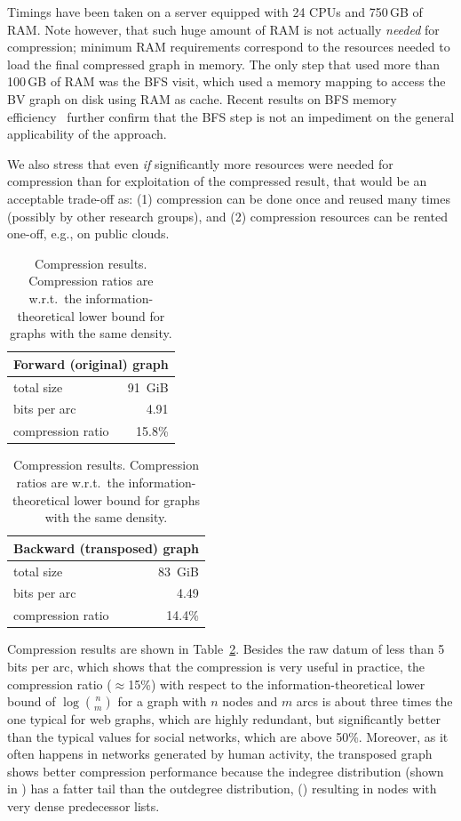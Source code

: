 Timings have been taken on a server equipped with 24 CPUs and 750\,GB of
RAM\@. Note however, that such huge amount of RAM is not actually \emph{needed}
for compression; minimum RAM requirements correspond to the resources needed to
load the final compressed graph in memory. The only step that used more than
100\,GB of RAM was the BFS visit, which used a memory mapping to access the BV
graph on disk using RAM as cache. Recent results on BFS memory
efficiency~\cite{hagerup2019bfs} further confirm that the BFS step is not an
impediment on the general applicability of the approach.

We also stress that even \emph{if} significantly more resources were needed for
compression than for exploitation of the compressed result, that would be an
acceptable trade-off as: (1) compression can be done once and reused many times
(possibly by other research groups), and (2) compression resources can be
rented one-off, e.g., on public clouds.

\smallskip

\begin{table}
  \centering
  \caption{Compression results. Compression ratios are w.r.t.~the
    information-theoretical lower bound for graphs with the same density.}%
  \label{tab:compression-bfs-results}

  \hfill
  \begin{tabular}{lr}
    \multicolumn{2}{c}{\textbf{Forward (original) graph}} \\
    \hline\hline
    total size         & 91~GiB \\
    bits per arc       & 4.91 \\
    compression ratio  & 15.8\% \\
    \hline
  \end{tabular}
  \hfill
  \begin{tabular}{lr}
    \multicolumn{2}{c}{\textbf{Backward (transposed) graph}} \\
    \hline\hline
    total size         & 83~GiB \\
    bits per arc       & 4.49  \\
    compression ratio  & 14.4\% \\
    \hline
  \end{tabular}
  \hfill
\end{table}

Compression results are shown in Table~\ref{tab:compression-bfs-results}.
Besides the raw datum of less than 5 bits per arc, which shows that the
compression is very useful in practice, the compression ratio ($\approx$15\%)
with respect to the information-theoretical lower bound of $\log {n\choose m}$
for a graph with $n$ nodes and $m$ arcs is about three times the one typical
for web graphs, which are highly redundant, but significantly better than the
typical values for social networks, which are above 50\%. Moreover, as it often
happens in networks generated by human activity, the transposed graph shows
better compression performance because the indegree distribution (shown in
) has a fatter tail than the outdegree
distribution, () resulting in nodes with very
dense predecessor lists.

